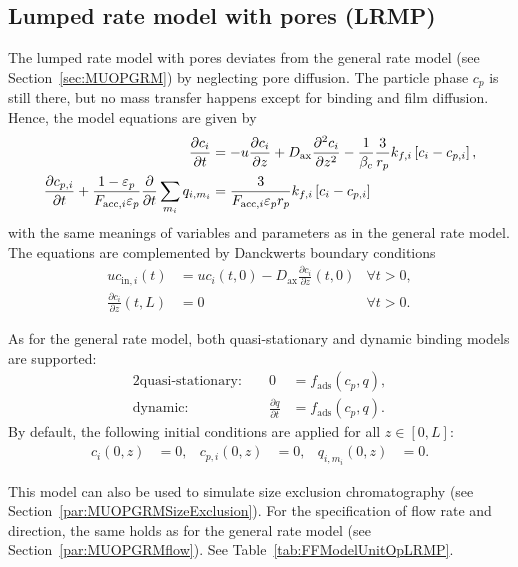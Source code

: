 \subsection{Lumped rate model with pores (LRMP)}\label{sec:MUOPLRMP}

The lumped rate model with pores  \cite{Guiochon2006,Felinger2004} deviates from the general rate model (see Section~\ref{sec:MUOPGRM}) by neglecting pore diffusion.
The particle phase $c_p$ is still there, but no mass transfer happens except for binding and film diffusion.
Hence, the model equations are given by
\begin{align}
	\frac{\partial c_i}{\partial t} &= -u \frac{\partial c_i}{\partial z} + D_{\text{ax}} \frac{\partial^2 c_i}{\partial z^2} - \frac{1}{\beta_c}\frac{3}{r_p}k_{f,i}\left[ c_i - c_{p,i} \right], \\
	\frac{\mathop{}\!\mathrm{\partial} c_{p,i}}{\mathop{}\!\mathrm{\partial} t} + \frac{1 - \varepsilon_p}{F_{\text{acc},i} \varepsilon_p} \frac{\mathop{}\!\mathrm{\partial}}{\mathop{}\!\mathrm{\partial} t} \sum_{m_i} q_{i,m_i} &= \frac{3}{F_{\text{acc},i} \varepsilon_p r_p}k_{f,i}\left[ c_i - c_{p,i} \right]
\end{align}
with the same meanings of variables and parameters as in the general rate model. 
The equations are complemented by Danckwerts boundary conditions \cite{Danckwerts1953}
\begin{align*}
	u c_{\text{in},i}(t) &= u c_i(t,0) - D_{\text{ax}} \frac{\partial c_i}{\partial z}(t, 0) & \forall t > 0,\\
	\frac{\partial c_i}{\partial z}(t, L) &= 0 & \forall t > 0.
\end{align*}

As for the general rate model, both quasi-stationary and dynamic binding models are supported:
\begin{alignat*}{2}
	\text{quasi-stationary: }& & 0 &= f_{\text{ads}}( c_p, q), \\
	\text{dynamic: }& & \frac{\partial q}{\partial t} &= f_{\text{ads}}( c_p, q).
\end{alignat*}
By default, the following initial conditions are applied for all $z \in [0,L]$:
\begin{align}
	c_i(0, z) &= 0, & c_{p,i}(0, z) &= 0, & q_{i,m_i}(0,z) &= 0.
\end{align}

This model can also be used to simulate size exclusion chromatography (see Section~\ref{par:MUOPGRMSizeExclusion}).
For the specification of flow rate and direction, the same holds as for the general rate model (see Section~\ref{par:MUOPGRMflow}).
See Table~\ref{tab:FFModelUnitOpLRMP}.

